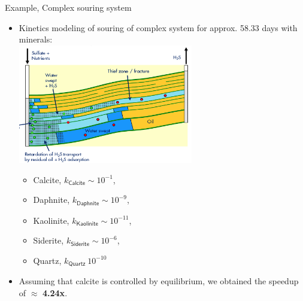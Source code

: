 \begin{frame}{Example, Complex souring system}
	\small 
	\begin{itemize}
		\item Kinetics modeling  of souring of complex system for approx. 58.33 days with minerals: \\[5pt]
		\lcol
		\hspace*{2cm}
		\includegraphics[width=0.6\textwidth]{figures/chemical-kinetics/souring.png}
		\rcol
		{\scriptsize
			\vskip -15pt
			\begin{itemize}
				\item Calcite,      $k_{\mathsf{Calcite}} \sim 10^{-1}$,  \\[-15pt]
				\item Daphnite,      $k_{\mathsf{Daphnite}} \sim 10^{-9}$,\\[-15pt]
				\item Kaolinite,     $k_{\mathsf{Kaolinite}} \sim 10^{-11}$,  \\[-15pt]
				\item Siderite,  $k_{\mathsf{Siderite}}  \sim 10^{-6}$,\\[-15pt]
				\item Quartz, $k_{\mathsf{Quartz}} ~10^{-10}$
			\end{itemize}
		}
		\ecol
	\vskip 5pt	
	\item Assuming that calcite is controlled by equilibrium, we obtained the speedup of $\approx$ \alert{\bf 4.24x}. 
	\end{itemize}
	\vskip -15pt
	\begin{figure}[!t]
		\centering
		 \qquad \qquad
	\end{figure}
\end{frame}


